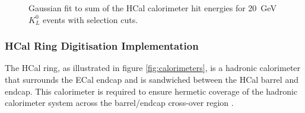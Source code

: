 \begin{figure}[h!]
\caption[Gaussian fit to sum of the HCal calorimeter hit energies for 20~GeV $K^{0}_{L}$ events with selection cuts.]{Gaussian fit to sum of the HCal calorimeter hit energies for 20~GeV $K^{0}_{L}$ events with selection cuts.}
\label{fig:hcaldigifit}
\end{figure}


\subsubsection{HCal Ring Digitisation Implementation}
\label{sec:hcalringdigi}
The HCal ring, as illustrated in figure \ref{fig:calorimeters}, is a hadronic calorimeter that surrounds the ECal endcap and is sandwiched between the HCal barrel and endcap.  This calorimeter is required to ensure hermetic coverage of the hadronic calorimeter system across the barrel/endcap cross-over region \cite{Behnke:2013lya}.  


